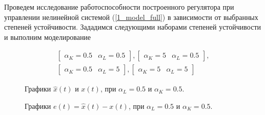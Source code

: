Проведем исследование работоспособности построенного регулятора при управлении нелинейной системой (\ref{1_model_full}) в зависимости от выбранных степеней устойчивости. Зададимся следующими наборами степеней устойчивости и выполним моделирование

\begin{equation}
    \begin{matrix}
    \begin{bmatrix}
       \alpha_K = 0.5 & \alpha_L = 0.5 
    \end{bmatrix} , \begin{bmatrix}
       \alpha_K = 5 & \alpha_L = 0.5 
    \end{bmatrix},\\
    \begin{bmatrix}
       \alpha_K = 0.5 & \alpha_L = 5 
    \end{bmatrix} , \begin{bmatrix}
       \alpha_K = 5 & \alpha_L = 5 
    \end{bmatrix}
    \end{matrix}
\end{equation}


\begin{figure}[!h]
\caption{Графики $\hat{x}(t)$ и $x(t)$, при $\alpha_L = 0.5$ и $\alpha_K = 0.5$.}
\label{4_6_0.50.5x}
\end{figure}

\begin{figure}[!h]
\caption{Графики $e(t) = \hat{x}(t)-x(t)$, при $\alpha_L = 0.5$ и $\alpha_K = 0.5$.}
\label{4_6_0.50.5e}
\end{figure}


